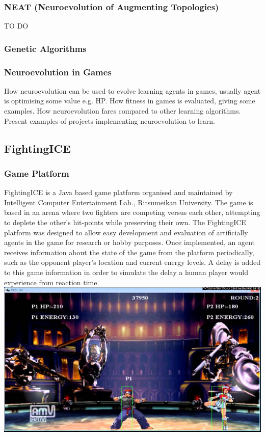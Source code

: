 \documentclass[12pt,a4paper]{article}
\begin{document}
\subsubsection*{NEAT (Neuroevolution of Augmenting Topologies)}
TO DO


\subsubsection{Genetic Algorithms}

\subsubsection{Neuroevolution in Games}
How neuroevolution can be used to evolve learning agents in games, usually agent is optimising some value e.g. HP. How fitness in games is evaluated, giving some examples. How neuroevolution fares compared to other learning algorithms. Present examples of projects implementing neuroevolution to learn.

\newpage
\subsection{FightingICE}
\subsubsection{Game Platform}
FightingICE is a Java based game platform organised and maintained by Intelligent Computer Entertainment Lab., Ritsumeikan University. The game is based in an arena where two fighters are competing versus each other, attempting to deplete the other's hit-points while preserving their own. The FightingICE platform was designed to allow easy development and evaluation of artificially agents in the game for research or hobby purposes. Once implemented, an agent receives information about the state of the game from the platform periodically, such as the opponent player's location and current energy levels. A delay is added to this game information in order to simulate the delay a human player would experience from reaction time.\\
\includegraphics[width=\textwidth]{fightingICE}
\end{document}
